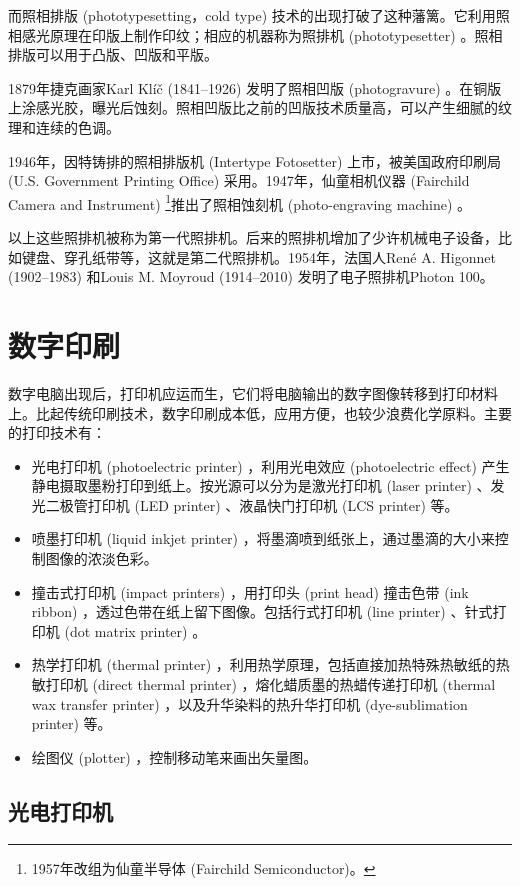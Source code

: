 而照相排版 (phototypesetting，cold type) 技术的出现打破了这种藩篱。它利用照相感光原理在印版上制作印纹；相应的机器称为照排机 (phototypesetter) 。照相排版可以用于凸版、凹版和平版。

1879年捷克画家Karl Klíč (1841--1926)\indexKlic{} 发明了照相凹版 (photogravure) 。在铜版上涂感光胶，曝光后蚀刻。照相凹版比之前的凹版技术质量高，可以产生细腻的纹理和连续的色调。

1946年，因特铸排的照相排版机 (Intertype Fotosetter) 上市，被美国政府印刷局 (U.S. Government Printing Office) 采用。1947年，仙童相机仪器 (Fairchild Camera and Instrument)\indexFairchild{} \footnote{1957年改组为仙童半导体 (Fairchild Semiconductor)。}推出了照相蚀刻机 (photo-engraving machine) 。

以上这些照排机被称为第一代照排机。后来的照排机增加了少许机械电子设备，比如键盘、穿孔纸带等，这就是第二代照排机。1954年，法国人René A. Higonnet (1902--1983)\indexHigonnet{} 和Louis M. Moyroud (1914--2010)\indexMoyroud{} 发明了电子照排机Photon 100。

\section{数字印刷}
数字电脑出现后，打印机应运而生，它们将电脑输出的数字图像转移到打印材料上。比起传统印刷技术，数字印刷成本低，应用方便，也较少浪费化学原料。主要的打印技术有：

\begin{itemize}
    \item 光电打印机 (photoelectric printer) ，利用光电效应 (photoelectric effect) 产生静电摄取墨粉打印到纸上。按光源可以分为是激光打印机 (laser printer) 、发光二极管打印机 (LED printer) 、液晶快门打印机 (LCS printer) 等。
    \item 喷墨打印机 (liquid inkjet printer) ，将墨滴喷到纸张上，通过墨滴的大小来控制图像的浓淡色彩。
    \item 撞击式打印机 (impact printers) ，用打印头 (print head) 撞击色带 (ink ribbon) ，透过色带在纸上留下图像。包括行式打印机 (line printer) 、针式打印机 (dot matrix printer) 。
    \item 热学打印机 (thermal printer) ，利用热学原理，包括直接加热特殊热敏纸的热敏打印机 (direct thermal printer) ，熔化蜡质墨的热蜡传递打印机 (thermal wax transfer printer) ，以及升华染料的热升华打印机 (dye-sublimation printer) 等。
    \item 绘图仪 (plotter) ，控制移动笔来画出矢量图。
\end{itemize}

\subsection{光电打印机}

